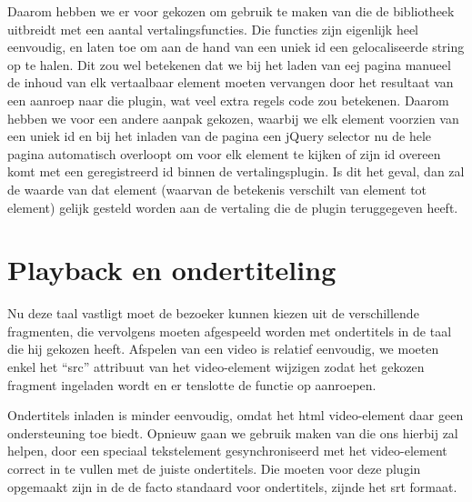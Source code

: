 Daarom hebben we er voor gekozen om gebruik te maken van  die de bibliotheek uitbreidt met een aantal vertalingsfuncties. Die functies zijn eigenlijk heel eenvoudig, en laten toe om aan de hand van een uniek id een gelocaliseerde string op te halen. Dit zou wel betekenen dat we bij het laden van eej pagina manueel de inhoud van elk vertaalbaar element moeten vervangen door het resultaat van een aanroep naar die plugin, wat veel extra regels code zou betekenen. Daarom hebben we voor een andere aanpak gekozen, waarbij we elk element voorzien van een uniek id en bij het inladen van de pagina een jQuery selector nu de hele pagina automatisch overloopt om voor elk element te kijken of zijn id overeen komt met een geregistreerd id binnen de vertalingsplugin. Is dit het geval, dan zal de waarde van dat element (waarvan de betekenis verschilt van element tot element) gelijk gesteld worden aan de vertaling die de plugin teruggegeven heeft.

\section{Playback en ondertiteling}
\label{voorstellingen:metavoorstelling:playback}

Nu deze taal vastligt moet de bezoeker kunnen kiezen uit de verschillende fragmenten, die vervolgens moeten afgespeeld worden met ondertitels in de taal die hij gekozen heeft. Afspelen van een video is relatief eenvoudig, we moeten enkel het ``src'' attribuut van het video-element wijzigen zodat het gekozen fragment ingeladen wordt en er tenslotte de  functie op aanroepen.

Ondertitels inladen is minder eenvoudig, omdat het \ac{html} video-element daar geen ondersteuning toe biedt. Opnieuw gaan we gebruik maken van  die ons hierbij zal helpen, door een speciaal tekstelement gesynchroniseerd met het video-element correct in te vullen met de juiste ondertitels. Die moeten voor deze plugin opgemaakt zijn in de de facto standaard voor ondertitels, zijnde het \ac{srt} formaat.
